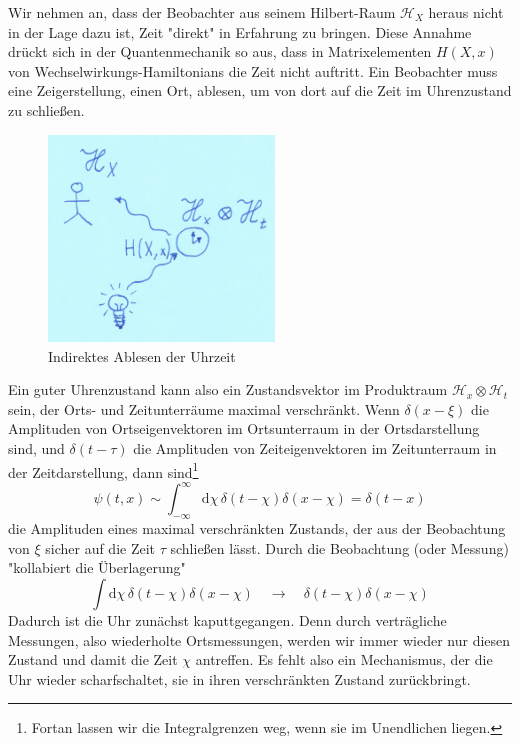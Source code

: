\documentclass[12pt]{article}
\begin{document}
Wir nehmen an, dass der Beobachter aus seinem Hilbert-Raum $\mathscr{H}_X$ heraus nicht in der Lage dazu ist, Zeit "direkt" in Erfahrung zu bringen. Diese Annahme drückt sich in der Quantenmechanik so aus, dass in Matrixelementen $H(X,x)$ von Wechselwirkungs-Hamiltonians die Zeit nicht auftritt. Ein Beobachter muss eine Zeigerstellung, einen Ort, ablesen, um von dort auf die Zeit im Uhrenzustand zu schließen. 

\begin{figure}[!h]\begin{center}
  \includegraphics[width=6cm]{Quantenuhr.png}
  \caption{Indirektes Ablesen der Uhrzeit}
  \label{fig:clock}
\end{center}\end{figure}

Ein guter Uhrenzustand kann also ein Zustandsvektor im Produktraum $\mathscr{H}_x \otimes \mathscr{H}_t$ sein, der Orts- und Zeitunterräume maximal verschränkt. Wenn $\delta(x-\xi)$ die Amplituden von Ortseigenvektoren im Ortsunterraum in der Ortsdarstellung sind, und $\delta(t-\tau)$ die Amplituden von Zeiteigenvektoren im Zeitunterraum in der Zeitdarstellung, dann sind\footnote{Fortan lassen wir die Integralgrenzen weg, wenn sie im Unendlichen liegen.}
\begin{equation} 
\label{eq:psi_clock}
\psi(t,x) \sim \int_{-\infty}^{\infty} \mathrm d\chi \, \delta(t-\chi) \delta(x-\chi) = \delta(t-x)
\end{equation}
die Amplituden eines maximal verschränkten Zustands, der aus der Beobachtung von $\xi$ sicher auf die Zeit $\tau$ schließen lässt. Durch die Beobachtung (oder Messung) "kollabiert die Überlagerung"
\begin{equation} 
\label{eq:collapse}
\int \mathrm d\chi \, \delta(t-\chi) \delta(x-\chi) \quad \rightarrow \quad \delta(t-\chi)\delta(x-\chi)
\end{equation}
Dadurch ist die Uhr zunächst kaputtgegangen. Denn durch verträgliche Messungen, also wiederholte Ortsmessungen, werden wir immer wieder nur diesen Zustand und damit die Zeit $\chi$ antreffen. Es fehlt also ein Mechanismus, der die Uhr wieder scharfschaltet, sie in ihren verschränkten Zustand zurückbringt.
\end{document}
